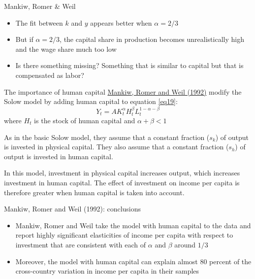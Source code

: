 \documentclass[10pt]{beamer}
\begin{document}
\begin{frame}{Mankiw, Romer \& Weil}
\begin{itemize}
    \item The fit between $k$ and $y$ appears better when $\alpha=2/3$ \smallskip
    \item But if $\alpha=2/3$, the capital share in production becomes unrealistically high and the wage share much too low \smallskip
    \item Is there something missing? Something that is similar to capital but that is compensated as labor?
\end{itemize}
\end{frame}


\begin{frame}{The importance of human capital}
    \href{https://scholar.harvard.edu/sites/scholar.harvard.edu/files/mankiw/files/contribution_to_the_empirics.pdf}{Mankiw, Romer and Weil (1992)} modify the Solow model by adding human capital to equation \eqref{eq19}:
    \begin{equation}\label{eq24}
        Y_t=A K_t^{\alpha} H_t^{\beta} L_t^{1-\alpha-\beta}
    \end{equation}
    where $H_t$ is the stock of human capital and $\alpha+\beta <1$\bigskip

    As in the basic Solow model, they assume that a constant fraction ($s_k$) of output is invested in physical capital. They also assume that a constant fraction ($s_h$) of output is invested in human capital. \bigskip 

    In this model, investment in physical capital increases output, which increases investment in human capital. The effect of investment on income per capita is therefore greater when human capital is taken into account.
\end{frame}


\begin{frame}{Mankiw, Romer and Weil (1992): conclusions}
    \begin{itemize}
        \item Mankiw, Romer and Weil take the model with human capital to the data and report highly significant elasticities of income per capita with respect to investment that are consistent with each of $\alpha$ and $\beta$ around $1/3$\medskip

        \item Moreover, the model with human capital can explain almost 80 percent of the cross-country variation in income per capita in their samples
    \end{itemize}
\end{frame}
\end{document}
